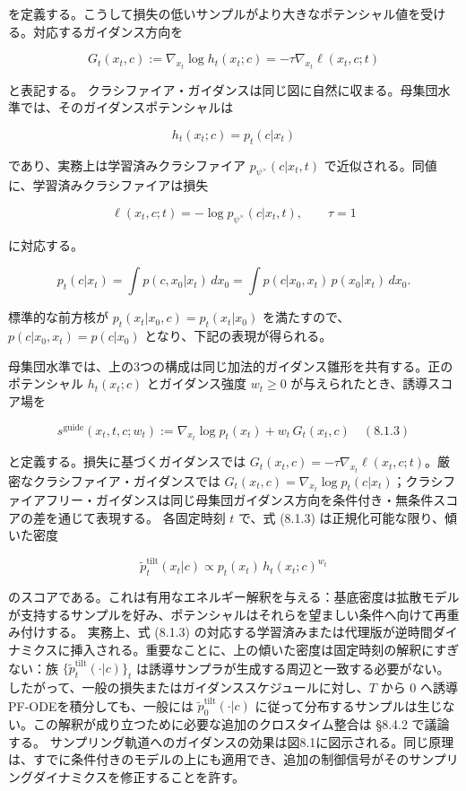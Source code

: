 を定義する。こうして損失の低いサンプルがより大きなポテンシャル値を受ける。対応するガイダンス方向を

\[
G_t(x_t,c):=\nabla_{x_t}\log h_t(x_t;c)=-\tau\nabla_{x_t}\ell(x_t,c;t)
\]


と表記する。
クラシファイア・ガイダンスは同じ図に自然に収まる。母集団水準では、そのガイダンスポテンシャルは

\[
h_t(x_t;c)=p_t(c|x_t)
\]


であり、実務上は学習済みクラシファイア $p_{\psi^\times}(c|x_t,t)$ で近似される。同値に、学習済みクラシファイアは損失

\[
\ell(x_t,c;t)=-\log p_{\psi^\times}(c|x_t,t),\qquad\tau=1
\]


に対応する。

\[
p_t(c|x_t)=\int p(c,x_0|x_t)\,dx_0=\int p(c|x_0,x_t)\,p(x_0|x_t)\,dx_0.
\]

標準的な前方核が $p_t(x_t|x_0,c)=p_t(x_t|x_0)$ を満たすので、$p(c|x_0,x_t)=p(c|x_0)$ となり、下記の表現が得られる。

母集団水準では、上の3つの構成は同じ加法的ガイダンス雛形を共有する。正のポテンシャル $h_t(x_t;c)$ とガイダンス強度 $w_t\ge 0$ が与えられたとき、誘導スコア場を

\[
s^{\mathrm{guide}}(x_t,t,c;w_t):=\nabla_{x_t}\log p_t(x_t)+w_t\,G_t(x_t,c) \quad (8.1.3)
\]


と定義する。損失に基づくガイダンスでは $G_t(x_t,c)=-\tau\nabla_{x_t}\ell(x_t,c;t)$。厳密なクラシファイア・ガイダンスでは $G_t(x_t,c)=\nabla_{x_t}\log p_t(c|x_t)$；クラシファイアフリー・ガイダンスは同じ母集団ガイダンス方向を条件付き・無条件スコアの差を通じて表現する。
各固定時刻 $t$ で、式 (8.1.3) は正規化可能な限り、傾いた密度

\[
\tilde{p}_t^{\mathrm{tilt}}(x_t|c)\propto p_t(x_t)\,h_t(x_t;c)^{w_t}
\]


のスコアである。これは有用なエネルギー解釈を与える：基底密度は拡散モデルが支持するサンプルを好み、ポテンシャルはそれらを望ましい条件へ向けて再重み付けする。
実務上、式 (8.1.3) の対応する学習済みまたは代理版が逆時間ダイナミクスに挿入される。重要なことに、上の傾いた密度は固定時刻の解釈にすぎない：族 $\{\tilde{p}_t^{\mathrm{tilt}}(\cdot|c)\}_t$ は誘導サンプラが生成する周辺と一致する必要がない。したがって、一般の損失またはガイダンススケジュールに対し、$T$ から $0$ へ誘導PF-ODEを積分しても、一般には $\tilde{p}_0^{\mathrm{tilt}}(\cdot|c)$ に従って分布するサンプルは生じない。この解釈が成り立つために必要な追加のクロスタイム整合は §8.4.2 で議論する。
サンプリング軌道へのガイダンスの効果は図8.1に図示される。同じ原理は、すでに条件付きのモデルの上にも適用でき、追加の制御信号がそのサンプリングダイナミクスを修正することを許す。

